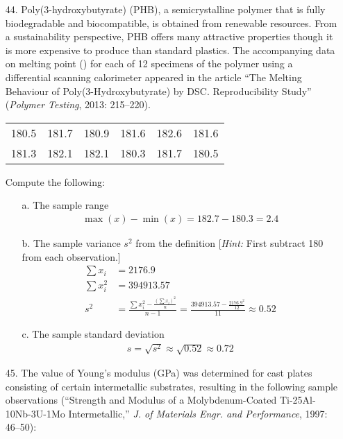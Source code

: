 \documentclass[letterpaper,12pt]{article}
\begin{document}
\maketitle

\begin{enumerate}
  \item[44.]
    Poly(3-hydroxybutyrate) (PHB), a semicrystalline polymer that is fully biodegradable and biocompatible, is obtained from renewable resources. From a sustainability perspective, PHB offers many attractive properties though it is more expensive to produce than standard plastics. The accompanying data on melting point (\textcelsius) for each of 12 specimens of the polymer using a differential scanning calorimeter appeared in the article ``The Melting Behaviour of Poly(3-Hydroxybutyrate) by DSC. Reproducibility Study'' (\textit{Polymer Testing}, 2013: 215–220).
    \begin{center}
      \begin{tabular}{*{6}{c}}
        180.5 & 181.7 & 180.9 & 181.6 & 182.6 & 181.6 \\
        181.3 & 182.1 & 182.1 & 180.3 & 181.7 & 180.5
      \end{tabular}
    \end{center}
    Compute the following:
    \begin{enumerate}
      \item[a.]
        The sample range
        \begin{align*}
          \max(x) - \min(x) = 182.7 - 180.3 = 2.4
        \end{align*}
      \item[b.]
        The sample variance $s^2$ from the definition [\textit{Hint:} First subtract 180 from each observation.]
        \begin{align*}
          \sum{x_i} &= 2176.9 \\
          \sum{x_i^2} &= 394913.57 \\
          s^2 &= \frac{\sum{x_i^2} - \frac{(\sum{x_i})^2}{n}}{n - 1} = \frac{394913.57 - \frac{2176.9^2}{12}}{11} \approx 0.52
        \end{align*}
      \item[c.] The sample standard deviation
        \begin{align*}
          s = \sqrt{s^2} \approx \sqrt{0.52} \approx 0.72
        \end{align*}
    \end{enumerate}
  \item[45.]
    The value of Young’s modulus (GPa) was determined for cast plates consisting of certain intermetallic substrates, resulting in the following sample observations (``Strength and Modulus of a Molybdenum-Coated Ti-25Al-10Nb-3U-1Mo Intermetallic,'' \textit{J. of Materials Engr. and Performance}, 1997: 46–50):

\end{enumerate}
\end{document}
